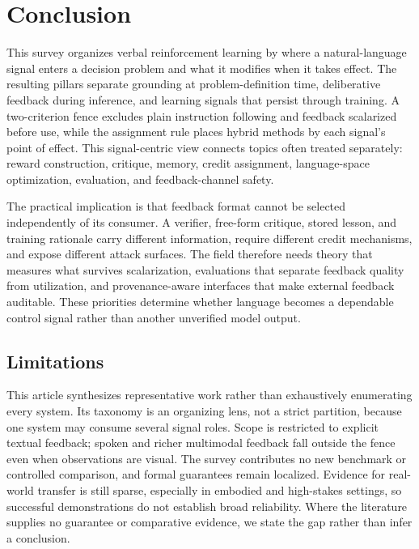 \section{Conclusion}
\label{sec:conclusion}

This survey organizes verbal reinforcement learning by where a natural-language signal enters a decision problem and what it modifies when it takes effect. The resulting pillars separate grounding at problem-definition time, deliberative feedback during inference, and learning signals that persist through training. A two-criterion fence excludes plain instruction following and feedback scalarized before use, while the assignment rule places hybrid methods by each signal's point of effect. This signal-centric view connects topics often treated separately: reward construction, critique, memory, credit assignment, language-space optimization, evaluation, and feedback-channel safety.

The practical implication is that feedback format cannot be selected independently of its consumer. A verifier, free-form critique, stored lesson, and training rationale carry different information, require different credit mechanisms, and expose different attack surfaces. The field therefore needs theory that measures what survives scalarization, evaluations that separate feedback quality from utilization, and provenance-aware interfaces that make external feedback auditable. These priorities determine whether language becomes a dependable control signal rather than another unverified model output.

\subsection{Limitations}
\label{subsec:limitations}

This article synthesizes representative work rather than exhaustively enumerating every system. Its taxonomy is an organizing lens, not a strict partition, because one system may consume several signal roles. Scope is restricted to explicit textual feedback; spoken and richer multimodal feedback fall outside the fence even when observations are visual. The survey contributes no new benchmark or controlled comparison, and formal guarantees remain localized. Evidence for real-world transfer is still sparse, especially in embodied and high-stakes settings, so successful demonstrations do not establish broad reliability. Where the literature supplies no guarantee or comparative evidence, we state the gap rather than infer a conclusion.
